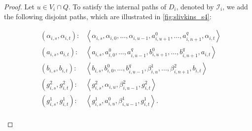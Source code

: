 \documentclass[a4paper,UKenglish,cleveref, autoref, thm-restate]{lipics-v2021}
\newcommand{\inners}{1.2pt}
\newcommand{\outers}{1pt}
\newcommand{\angled}[1]{\left\langle{#1}\right\rangle}
\begin{document}
    \begin{proof}
      Let $u \in V_i \cap Q$. To satisfy the internal paths of $D_i$, denoted by
      $\mathcal{I}_i$, we add the following
      disjoint paths, which are illustrated in \autoref{fig:slivkins_s4}:

      \begin{align*}
        &(\alpha_{i,s}, \alpha_{i,t}): &\angled{\alpha_{i,s}, \alpha_{i,0}, \dots,
        \alpha_{i,u-1}, a^0_{i,u+1}, \dots, a^q_{i, n+1}, \alpha_{i,t}}\\
        &(a_{i,s}, a_{i,t}): &\angled{a_{i,s}, a^0_{i,0}, \dots, a^q_{i,u-1}, b^0_{i,u+1}, \dots,
        b^q_{i, n+1}, a_{i,t}}\\
        &(b_{i,s}, b_{i,t}): &\angled{b_{i,s}, b^0_{i,0}, \dots, b^q_{i,u-1}, \beta^1_{i,u}, \dots,
        \beta^2_{i, n+1}, b_{i,t}}\\
        &(g^2_{i,s}, g^2_{i,t}): &\angled{g^2_{i,s}, \alpha_{i,u}, \beta^2_{i,u-1}, g^2_{i,t}}\\
        &(g^1_{i,s}, g^1_{i,t}): &\angled{g^1_{i,s}, a^0_{i,u}, \beta^1_{i,u-1}, g^1_{i,t}}.\\
      \end{align*}

      \begin{figure}[!htb]
        \centering
\end{figure}
\end{proof}
\end{document}
